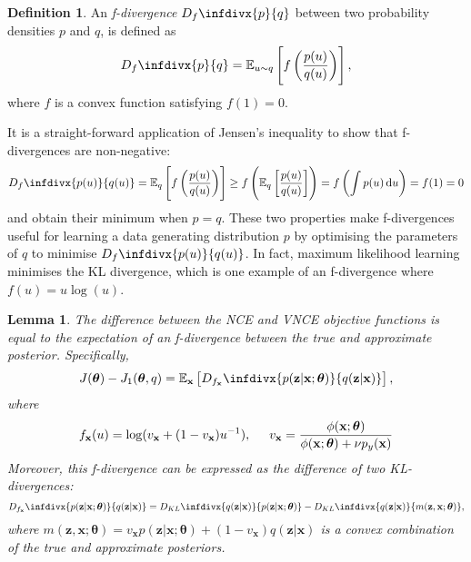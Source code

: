 \documentclass[11pt, oneside]{article}
\newcommand{\thetab}{{\boldsymbol{\theta}}}
\newcommand{\pnn}{\phi}
\newcommand{\x}{{\mathbf x}}
\newcommand{\z}{{\mathbf z}}
\newcommand{\E}{\mathbb{E}}
\newcommand{\Ex}{\E_{\x}}
\newtheorem{lemma}[theorem]{Lemma}
\theoremstyle{definition}
\newtheorem{definition}{Definition}[section]
\newcommand{\infdiv}[1]{D_{#1}\infdivx}
\begin{document}
\theoremstyle{definition}
\begin{definition}
An \emph{f-divergence} $\infdiv{f}{p}{q}$ between two probability densities $p$ and $q$, is defined as
\begin{equation}
    \infdiv{f}{p}{q} = \mathbb{E}_{u \sim q} \left[ f\left(\frac{p(u)}{q(u)}\right) \right],
\end{equation}
where $f$ is a convex function satisfying $f(1) = 0$.
\end{definition}
It is a straight-forward application of Jensen's inequality to show that f-divergences are non-negative:
\begin{equation}
    \infdiv{f}{p(u)}{q(u)} = \mathbb{E}_q \left[ f\left( \frac{p(u)}{q(u)} \right) \right] \geq f\left( \mathbb{E}_q \left[  \frac{p(u)}{q(u)} \right]  \right) = f \left( \int p(u) \dif u \right) = f(1) = 0
\end{equation}
and obtain their minimum when $p = q$. These two properties make f-divergences useful for learning a data generating distribution $p$ by optimising the parameters of $q$ to minimise $\infdiv{f}{p(u)}{q(u)}$. In fact, maximum likelihood learning minimises the KL divergence, which is one example of an f-divergence where $f(u) = u \log(u)$.
\begin{lemma}
\label{lemma: diff J - J1}
    The difference between the NCE and VNCE objective functions is equal to the expectation of an f-divergence between the true and approximate posterior. Specifically,
    \begin{equation}
        J(\thetab) - J_1(\thetab, q) = \Ex \left[ \infdiv{f_{\x}}{p(\z | \x; \thetab)}{q(\z | \x)} \right],
    \end{equation}
where
\begin{equation}
    f_{\x}(u) = \log(v_{\x} + (1 - v_{\x})u^{-1}), \hspace{5mm} v_{\x} = \frac{\pnn(\x; \thetab)}{\pnn(\x; \thetab) + \nu p_{y}(\x)}
\end{equation}
Moreover, this f-divergence can be expressed as the difference of two KL-divergences:
\begin{equation}
\label{eq: f-divergence is diff of two KLs}
     \infdiv{f_{\x}}{p(\z | \x; \thetab)}{q(\z | \x)} = \infdiv{KL}{q(\z | \x)}{p(\z | \x; \thetab)} - \infdiv{KL}{q(\z | \x)}{m(\z, \x ; \thetab)},
\end{equation}
where $m(\z, \x ; \thetab) = v_{\x}p(\z | \x; \thetab) + (1 - v_{\x})q(\z | \x)$ is a convex combination of the true and approximate posteriors.
\end{lemma}
\end{document}
